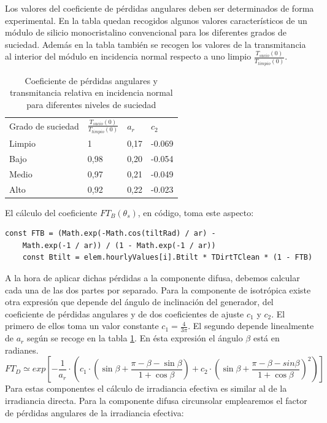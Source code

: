 Los valores del coeficiente de pérdidas angulares deben ser determinados de forma experimental. En la tabla quedan recogidos algunos valores característicos de un módulo de silicio monocristalino convencional para los diferentes grados de suciedad. Además en la tabla también se recogen los valores de la transmitancia al interior del módulo en incidencia normal respecto a uno limpio $\frac{T_{sucio}(0)}{T_{limpio}(0)}$.

\begin{table}[ht]
\centering
\begin{tabular}{llll}
\hline
Grado de suciedad & $\frac{T_{sucio}(0)}{T_{limpio}(0)}$ & $a_r$ & $c_2$ \\
Limpio            & 1                                                          & 0,17 & -0.069 \\
Bajo              & 0,98                                                       & 0,20 & -0.054 \\
Medio             & 0,97                                                       & 0,21 & -0.049 \\
Alto              & 0,92                                                       & 0,22 & -0.023
\end{tabular}
\label{tab:perdidas_suciedad}
\caption{Coeficiente de pérdidas angulares y transmitancia relativa en incidencia normal para diferentes niveles de suciedad }
\end{table}
El cálculo del coeficiente $FT_B(\theta_s)$, en código, toma este aspecto:
\begin{lstlisting}[style=ES6, caption={Cálculo del coeficiente $FT_B(\theta_s)$}]
	const FTB = (Math.exp(-Math.cos(tiltRad) / ar) - 
	Math.exp(-1 / ar)) / (1 - Math.exp(-1 / ar))
	const Btilt = elem.hourlyValues[i].Btilt * TDirtTClean * (1 - FTB)
\end{lstlisting}

A la hora de aplicar dichas pérdidas a la componente difusa, debemos calcular cada una de las dos partes por separado. Para la componente de isotrópica existe otra expresión que depende del ángulo de inclinación del generador, del coeficiente de pérdidas angulares y de dos coeficientes de ajuste $c_1$ y $c_2$. El primero de ellos toma un valor constante $c_1=\frac{4}{3\pi}$. El segundo depende linealmente de $a_r$ según se recoge en la tabla \ref{tab:perdidas_suciedad}. En ésta expresión el ángulo $\beta$ está en radianes.
\begin{equation}
FT_D \simeq exp[-\frac{1}{a_r}\cdot(c_1\cdot(\sin\beta + \frac{\pi-\beta-\sin\beta}{1+\cos\beta	})+c_2\cdot(\sin\beta + \frac{\pi-\beta-sin\beta}{1+\cos\beta})^2)]
\end{equation}
Para estas componentes el cálculo de irradiancia efectiva es similar al de la irradiancia directa. Para la componente difusa circunsolar emplearemos el factor de pérdidas angulares de la irradiancia efectiva:

